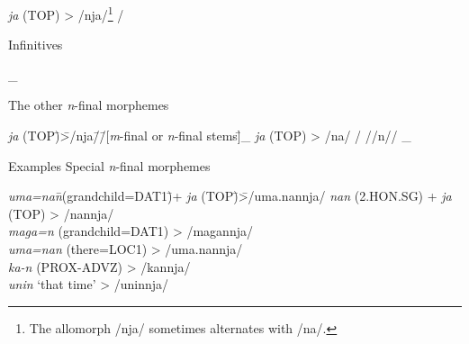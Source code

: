 \begin{exe}
\begin{xlist}
\begin{tabbing}
    \textit{ja} (TOP) \> > \> /nja/\footnote{The allomorph /nja/ sometimes alternates with /na/.} \> / \>  \parbox[t]{\widthof{[\textit{m}{}-final or \textit{n}{}-final stems]}}{Infinitives\\} \>   \_\\
    \end{tabbing}     
    \ex  The other \textit{n}{}-final morphemes 
    \begin{tabbing}
    \textit{ja} (TOP)\hspace{\tabcolsep}\=\hspace{\tabcolsep}>\hspace{\tabcolsep}\=\hspace{\tabcolsep}/nja/\hspace{\tabcolsep}\=\hspace{\tabcolsep}/\hspace{\tabcolsep}\=\hspace{\tabcolsep}[\textit{m}{}-final or \textit{n}{}-final stems]\hspace{\tabcolsep}\=\hspace{\tabcolsep}\_\kill 
    \textit{ja} (TOP) \> > \> /na/ \> /  \>  //n// \> \_    \\
    \end{tabbing}
   \end{xlist}
\end{exe}
\ea Examples\label{ex:10.4}
  \ea Special \textit{n}-final morphemes
    \begin{tabbing}
    \textit{uma=nan}\hspace{\tabcolsep}\=\hspace{\tabcolsep}(grandchild=DAT1)\hspace{\tabcolsep}\=\hspace{\tabcolsep}+  \textit{ja} (TOP)\hspace{\tabcolsep}\=\hspace{\tabcolsep}>\hspace{\tabcolsep}\=\hspace{\tabcolsep}/uma.nannja/\kill
    \textit{nan}     \>  (2.HON.SG)         \> +  \textit{ja} (TOP) \> > \> /nannja/    \\
    \textit{maga=n}  \>  (grandchild=DAT1)  \>                      \> > \> /magannja/  \\
    \textit{uma=nan} \>  (there=LOC1)       \>                      \> > \> /uma.nannja/\\
    \textit{ka-n}    \>  (PROX-ADVZ)        \>                      \> > \> /kannja/    \\
    \textit{unin}    \>   ‘that time’       \>                      \> > \> /uninnja/   \\
    \end{tabbing}

